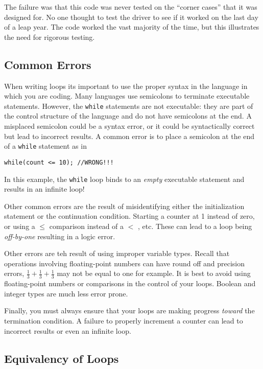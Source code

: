 The failure was that this code was never tested on the 
``corner cases'' that it was designed for.  No one thought to test the driver to see
if it worked on the last day of a leap year.  The code worked the vast majority of the time, 
but this illustrates the need for rigorous testing.

\subsection{Common Errors}

When writing loops its important to use the proper syntax in the
language in which you are coding.  Many languages use semicolons
to terminate executable statements.  However, the \texttt{while}
statements are not executable: they are part of the control structure
of the language and do not have semicolons at the end.  A misplaced
semicolon could be a syntax error, or it could be syntactically correct
but lead to incorrect results.  A common error is to place a semicolon
at the end of a \texttt{while} statement as in 

\texttt{while(count <= 10); //WRONG!!!}

In this example, the \texttt{while} loop binds to an \emph{empty}
executable statement and results in an infinite loop!

Other common errors are the result of misidentifying either the
initialization statement or the continuation condition.  Starting a
counter at 1 instead of zero, or using a $\leq$ comparison instead
of a $<$ , etc.  These can lead to a loop being \emph{off-by-one} 
resulting in a logic error.

Other errors are teh result of using improper variable types.
Recall that operations involving floating-point numbers can have 
round off and precision errors, $\frac{1}{3} + \frac{1}{3} + \frac{1}{3}$
may not be equal to one for example.  It is best to avoid using 
floating-point numbers or comparisons in the control of your loops.
Boolean and integer types are much less error prone.  

Finally, you must always ensure that your loops are making progress
\emph{toward} the termination condition.  A failure to properly 
increment a counter can lead to incorrect results or even an infinite
loop.

\subsection{Equivalency of Loops}

